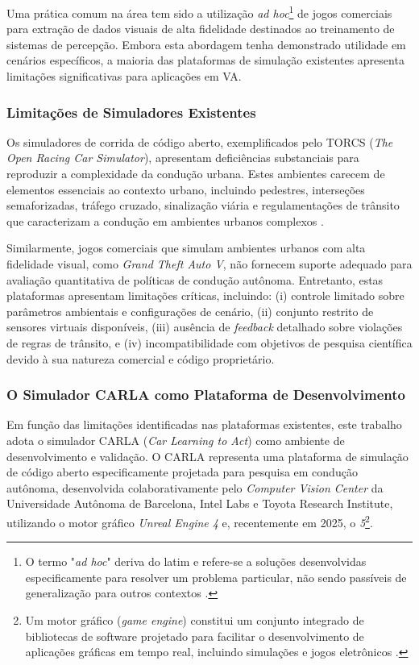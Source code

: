 Uma prática comum na área tem sido a utilização \textit{ad hoc}\footnote{O termo "\textit{ad hoc}" deriva do latim e refere-se a soluções desenvolvidas especificamente para resolver um problema particular, não sendo passíveis de generalização para outros contextos \cite{noauthor_undated-sq}.} de jogos comerciais para extração de dados visuais de alta fidelidade destinados ao treinamento de sistemas de percepção. Embora esta abordagem tenha demonstrado utilidade em cenários específicos, a maioria das plataformas de simulação existentes apresenta limitações significativas para aplicações em VA.

\subsubsection{Limitações de Simuladores Existentes}

Os simuladores de corrida de código aberto, exemplificados pelo TORCS (\textit{The Open Racing Car Simulator}), apresentam deficiências substanciais para reproduzir a complexidade da condução urbana. Estes ambientes carecem de elementos essenciais ao contexto urbano, incluindo pedestres, interseções semaforizadas, tráfego cruzado, sinalização viária e regulamentações de trânsito que caracterizam a condução em ambientes urbanos complexos \cite[p. ~1]{dosovitskiy2017carla}.

Similarmente, jogos comerciais que simulam ambientes urbanos com alta fidelidade visual, como \textit{Grand Theft Auto V}, não fornecem suporte adequado para avaliação quantitativa de políticas de condução autônoma. Entretanto, estas plataformas apresentam limitações críticas, incluindo: (i) controle limitado sobre parâmetros ambientais e configurações de cenário, (ii) conjunto restrito de sensores virtuais disponíveis, (iii) ausência de \textit{feedback} detalhado sobre violações de regras de trânsito, e (iv) incompatibilidade com objetivos de pesquisa científica devido à sua natureza comercial e código proprietário.

\subsubsection{O Simulador CARLA como Plataforma de Desenvolvimento} \label{subsubsec:simulador_carla}

Em função das limitações identificadas nas plataformas existentes, este trabalho adota o simulador CARLA (\textit{Car Learning to Act})  como ambiente de desenvolvimento e validação. O CARLA representa uma plataforma de simulação de código aberto especificamente projetada para pesquisa em condução autônoma, desenvolvida colaborativamente pelo \textit{Computer Vision Center} da Universidade Autônoma de Barcelona, Intel Labs e Toyota Research Institute, utilizando o motor gráfico \textit{Unreal Engine 4} e, recentemente em 2025, o \textit{5}\footnote{Um motor gráfico (\textit{game engine}) constitui um conjunto integrado de bibliotecas de software projetado para facilitar o desenvolvimento de aplicações gráficas em tempo real, incluindo simulações e jogos eletrônicos \cite{lewis2002game}.}.

